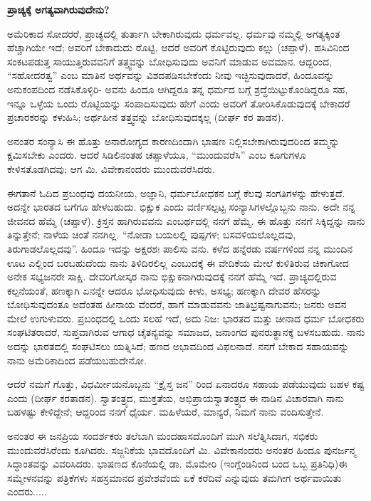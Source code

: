\begin{center}
\textbf{ಪ್ರಾಚ್ಯಕ್ಕೆ ಅಗತ್ಯವಾಗಿರುವುದೇನು?}
\end{center}

ಅಮೆರಿಕಾದ ಸೋದರರೆ, ಪ್ರಾಚ್ಯದಲ್ಲಿ ತುರ್ತಾಗಿ ಬೇಕಾಗಿರುವುದು ಧರ್ಮವಲ್ಲ. ಧರ್ಮವು ನಮ್ಮಲ್ಲಿ ಅಗತ್ಯಕ್ಕಿಂತ ಹೆಚ್ಚಾಗಿಯೇ ಇದೆ; ಅವರಿಗೆ ಬೇಕಾದುದು ರೊಟ್ಟಿ, ಆದರೆ ಅವರಿಗೆ ಕೊಟ್ಟಿರುವುದು ಕಲ್ಲು (ಚಪ್ಪಾಳೆ). ಹಸಿವಿನಿಂದ ಸಂಕಟಪಡುತ್ತ ಸಾಯುತ್ತಿರುವವನಿಗೆ ತತ್ತ್ವವನ್ನು ಬೋಧಿಸುವುದು ಅವನಿಗೆ ಮಾಡುವ ಅವಮಾನ. ಆದ್ದರಿಂದ, “ಸಹೋದರತ್ವ” ಎಂಬ ಮಾತಿನ ಅರ್ಥವನ್ನು ವಿಶದಪಡಿಸಬೇಕೆಂದು ನೀವು ಇಚ್ಛಿಸುವುದಾದರೆ, ಹಿಂದೂವನ್ನು ಅನುಕಂಪದಿಂದ ನಡೆಸಿಕೊಳ್ಳಿರಿ- ಅವನು ಹಿಂದೂ ಆಗಿದ್ದರೂ ತನ್ನ ಧರ್ಮದ ಬಗ್ಗೆ ಶ್ರದ್ಧೆಯಿಟ್ಟುಕೊಂಡಿದ್ದರೂ ಸಹ, ಇನ್ನೂ ಒಳ್ಳೆಯ ಒಂದು ರೊಟ್ಟಿಯನ್ನು ಸಂಪಾದಿಸುವುದು ಹೇಗೆ ಎಂದು ಅವರಿಗೆ ತೋರಿಸಿಕೊಡುವುದಕ್ಕೆ ಬೇಕಾದರೆ ಪ್ರಚಾರಕರನ್ನು ಕಳುಹಿಸಿ; ಅರ್ಥಹೀನ ತತ್ತ್ವವನ್ನು ಬೋಧಿಸುವುದಕ್ಕಲ್ಲ (ದೀರ್ಘ ಕರ ತಾಡನ).

ಅನಂತರ ಸಂನ್ಯಾಸಿ ಈ ಹೊತ್ತು ಅನಾರೋಗ್ಯದ ಕಾರಣದಿಂದಾಗಿ ಭಾಷಣ ನಿಲ್ಲಿಸಬೇಕಾಗಿರುವುದರಿಂದ ತಮ್ಮನ್ನು ಕ್ಷಮಿಸಬೇಕು ಎಂದರು. ಆದರೆ ಸಿಡಿಲಿನಂತಹ ಚಪ್ಪಾಳೆಯೂ, “ಮುಂದುವರೆಸಿ” ಎಂಬ ಕೂಗುಗಳೂ ಕೇಳಿಸತೊಡಗಿದವು; ಆಗ ಮಿ. ವಿವೇಕಾನಂದರು ಮುಂದುವರೆಸಿದರು.

ಈಗತಾನೆ ಓದಿದ ಪ್ರಬಂಧವು ದಯನೀಯ, ಅಜ್ಞಾನಿ, ಧರ್ಮಬೋಧಕನ ಬಗ್ಗೆ ಕೆಲವು ಸಂಗತಿಗಳನ್ನು ಹೇಳುತ್ತದೆ. ಅದನ್ನೇ ಭಾರತದ ಬಗೆಗೂ ಹೇಳಬಹುದು. ಭಿಕ್ಷುಕ ಎಂದು ವರ್ಣಿಸಲ್ಪಟ್ಟ ಸಂನ್ಯಾಸಿಗಳಲ್ಲೊಬ್ಬನು ನಾನು. ಅದೇ ನನ್ನ ಜೀವನದ ಹೆಮ್ಮೆ (ಚಪ್ಪಾಳೆ). ಕ್ರಿಸ್ತನ ಹಾಗಿರುವವನು ಎಂಬರ್ಥದಲ್ಲಿ ನನಗೆ ಹೆಮ್ಮೆ. ಈ ಹೊತ್ತು ನನಗೆ ಸಿಕ್ಕಿದ್ದನ್ನು ನಾನು ತಿನ್ನುತ್ತೇನೆ; ನಾಳೆಯ ಚಿಂತೆ ನನಗಿಲ್ಲ. “ನೋಡಾ ಬಯಲಲ್ಲಿ ಪುಷ್ಪಗಳ; ಬಸವಳಿಯಲೊಲ್ಲದವು, ತಿರುಗಾಡಲೊಲ್ಲದವು”. ಹಿಂದೂ ಇದನ್ನು ಅಕ್ಷರಶಃ ಪಾಲಿಸು ವನು. ಕಳೆದ ಹನ್ನೆರಡು ವರ್ಷಗಳಿಂದ ನನ್ನ ಮುಂದಿನ ಊಟ ಎಲ್ಲಿಂದ ಬರಬಹುದೆಂದು ನಾನು ತಿಳಿದಿರಲಿಲ್ಲ ಎಂಬುದಕ್ಕೆ ಈ ವೇದಿಕೆಯ ಮೇಲೆ ಕುಳಿತಿರುವ ಚಿಕಾಗೋದ ಅನೇಕ ಸಭ್ಯಜನರೇ ಸಾಕ್ಷಿ. ದೇವರಿಗೋಸ್ಕರ ನಾನು ಭಿಕ್ಷುಕನಾಗಿರುವುದಕ್ಕೆ ನನಗೆ ಹೆಮ್ಮೆ ಇದೆ. ಪ್ರಾಚ್ಯದಲ್ಲಿರುವ ಕಲ್ಪನೆಯಂತೆ, ಹಣಕ್ಕಾಗಿ ಏನನ್ನೇ ಆದರೂ ಭೋಧಿಸುವುದು ಕೀಳು, ಅಸಭ್ಯ; ಹಣಕ್ಕಾಗಿ ದೇವರ ಹೆಸರನ್ನು ಬೋಧಿಸುವುದಂತೂ ಅದೆಂತಹ ಹೀನಾಯ ವೆಂದರೆ, ಹಾಗೆ ಮಾಡುವವನು ಜಾತಿಭ್ರಷ್ಟನಾಗುವನು; ಜನರು ಅವನ ಮೇಲೆ ಉಗುಳುವರು. ಪ್ರಬಂಧದಲ್ಲಿ ಒಂದು ಸಲಹೆ ಇದೆ, ಅದು ನಿಜ: ಭಾರತದ ಮತ್ತು ಚೀನಾದ ಧರ್ಮ ಬೋಧಕರು ಸಂಘಟಿತರಾದರೆ, ಸುಪ್ತವಾಗಿರುವ ಆಗಾಧ ಚೈತನ್ಯವನ್ನು ಸಮಾಜದ, ಜನಾಂಗದ ಪುನರುತ್ಥಾನಕ್ಕೆ ಬಳಸಬಹುದು. ನಾನು ಅದನ್ನು ಭಾರತದಲ್ಲಿ ಸಂಘಟಿಸಲು ಯತ್ನಿಸಿದೆ; ಹಣದ ಅಭಾವದಿಂದ ವಿಫಲನಾದೆ. ನನಗೆ ಬೇಕಾದ ಸಹಾಯವನ್ನು ನಾನು ಅಮೆರಿಕಾದಿಂದ ಪಡೆಯಬಹುದೇನೋ.

ಆದರೆ ನಮಗೆ ಗೊತ್ತು, ವಿಧರ್ಮೀಯನೊಬ್ಬನು “ಕ್ರೈಸ್ತ ಜನ” ರಿಂದ ಏನಾದರೂ ಸಹಾಯ ಪಡೆಯುವುದು ಬಹಳ ಕಷ್ಟ ಎಂದು (ದೀರ್ಘ ಕರತಾಡನ). ಸ್ವಾತಂತ್ರ್ಯದ, ಮುಕ್ತತೆಯ, ಅಭಿಪ್ರಾಯಸ್ವಾತಂತ್ರ್ಯದ ಈ ನಾಡಿನ ವಿಚಾರವಾಗಿ ನಾನು ಬಹಳಷ್ಟು ಕೇಳಿದ್ದೇನೆ; ಆದ್ದರಿಂದ ನನಗೆ ಧೈರ್ಯ. ಮಹಿಳೆಯರೆ, ಮಾನ್ಯರೆ, ನಿಮಗೆ ನಾನು ವಂದಿಸುತ್ತೇನೆ.

ಅನಂತರ ಈ ಜನಪ್ರಿಯ ಸಂದರ್ಶಕರು ತಲೆಬಾಗಿ ಮಂದಹಾಸದೊಂದಿಗೆ ಮುಗಿ ಸಲೆತ್ನಿಸಿದಾಗ, ಸಭಿಕರು ಮುಂದುವರೆಸಿರೆಂದು ಕೂಗಿದರು. ಸಜ್ಜನಿಕೆಯ ಭಾವದೊಂದಿಗೆ ಮಿ. ವಿವೇಕಾನಂದರು ಅನಂತರ ಹಿಂದೂ ಪುನರ್ಜನ್ಮ ಸಿದ್ಧಾಂತವನ್ನು ವಿವರಿಸಿದರು. ಭಾಷಣದ ಕೊನೆಯಲ್ಲಿ ಡಾ. ಮೊಮೇರಿ (ಇಂಗ್ಲೆಂಡಿನಿಂದ ಬಂದ ಒಬ್ಬ ಪ್ರತಿನಿಧಿ)ಈ ಸಮ್ಮೇಳನವನ್ನು ಪತ್ರಿಕೆಗಳು ಸಹಸ್ರಮಾನದ ಪ್ರವೇಶವೆಂದು ಏಕೆ ಕರೆದಿವೆ ಎನ್ನುವುದು ತಮಗೀಗ ಅರ್ಥವಾಯಿತು ಎಂದರು.....

